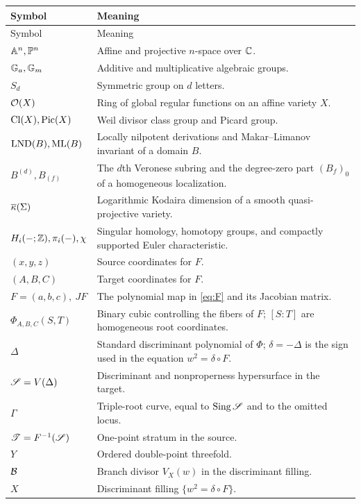 \begin{longtable}{>{\raggedright\arraybackslash}p{}p{}}
\toprule
Symbol & Meaning \\
\midrule
\endfirsthead
\toprule
Symbol & Meaning \\
\midrule
\endhead
$\mathbb A^n,\mathbb P^n$ & Affine and projective $n$-space over $\mathbb C$. \\
$\mathbb G_a,\mathbb G_m$ & Additive and multiplicative algebraic groups. \\
$S_d$ & Symmetric group on $d$ letters. \\
$\mathcal O(X)$ & Ring of global regular functions on an affine variety $X$. \\
$\operatorname{Cl}(X),\operatorname{Pic}(X)$ & Weil divisor class group and Picard group. \\
$\operatorname{LND}(B),\operatorname{ML}(B)$ & Locally nilpotent derivations and Makar--Limanov invariant of a domain $B$. \\
$B^{(d)},B_{(f)}$ & The $d$th Veronese subring and the degree-zero part $(B_f)_0$ of a homogeneous localization. \\
$\overline\kappa(\Sigma)$ & Logarithmic Kodaira dimension of a smooth quasi-projective variety. \\
$H_i(-;\mathbb Z),\pi_i(-),\chi$ & Singular homology, homotopy groups, and compactly supported Euler characteristic. \\
$(x,y,z)$ & Source coordinates for $F$. \\
$(A,B,C)$ & Target coordinates for $F$. \\
$F=(a,b,c),\ JF$ & The polynomial map in \eqref{eq:F} and its Jacobian matrix. \\
$\Phi_{A,B,C}(S,T)$ & Binary cubic controlling the fibers of $F$; $[S:T]$ are homogeneous root coordinates. \\
$\Delta$ & Standard discriminant polynomial of $\Phi$; $\delta=-\Delta$ is the sign used in the equation $w^2=\delta\circ F$. \\
$\mathscr S=V(\Delta)$ & Discriminant and nonproperness hypersurface in the target. \\
$\Gamma$ & Triple-root curve, equal to $\operatorname{Sing}\mathscr S$ and to the omitted locus. \\
$\mathscr T=F^{-1}(\mathscr S)$ & One-point stratum in the source. \\
$Y$ & Ordered double-point threefold. \\
$\mathcal B$ & Branch divisor $V_X(w)$ in the discriminant filling. \\
$X$ & Discriminant filling $\{w^2=\delta\circ F\}$. \\

\end{longtable}
